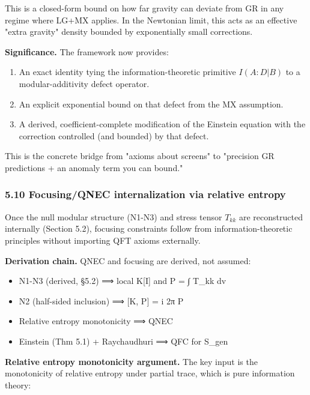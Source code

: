 This is a closed-form bound on how far gravity can deviate from GR in any regime where LG+MX applies. In the Newtonian limit, this acts as an effective "extra gravity" density bounded by exponentially small corrections.

\textbf{Significance.} The framework now provides:

\begin{enumerate}
\def\labelenumi{\arabic{enumi}.}
\tightlist
\item
  An exact identity tying the information-theoretic primitive \(I(A:D|B)\) to a modular-additivity defect operator.
\item
  An explicit exponential bound on that defect from the MX assumption.
\item
  A derived, coefficient-complete modification of the Einstein equation with the correction controlled (and bounded) by that defect.
\end{enumerate}

This is the concrete bridge from "axioms about screens" to "precision GR predictions + an anomaly term you can bound."

\subsubsection{5.10 Focusing/QNEC internalization via relative entropy}\label{510-focusingqnec-internalization-via-relative-entropy}

Once the null modular structure (N1-N3) and stress tensor \(T_{kk}\) are reconstructed internally (Section 5.2), focusing constraints follow from information-theoretic principles without importing QFT axioms externally.

\textbf{Derivation chain.} QNEC and focusing are derived, not assumed:

\begin{itemize}
\tightlist
\item
  N1-N3 (derived, §5.2) ⟹ local K{[}I{]} and P = ∫ T\_kk dv
\item
  N2 (half-sided inclusion) ⟹ {[}K, P{]} = i 2π P
\item
  Relative entropy monotonicity ⟹ QNEC
\item
  Einstein (Thm 5.1) + Raychaudhuri ⟹ QFC for S\_gen
\end{itemize}

\textbf{Relative entropy monotonicity argument.} The key input is the monotonicity of relative entropy under partial trace, which is pure information theory:

